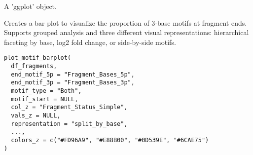 \documentclass[a4paper]{book}
\begin{document}
%
\begin{Value}
A 'ggplot' object.
\end{Value}
%
\begin{Description}
Creates a bar plot to visualize the proportion of 3-base motifs at fragment ends. Supports grouped analysis and
three different visual representations: hierarchical faceting by base, log2 fold change, or side-by-side motifs.
\end{Description}
%
\begin{Usage}
\begin{verbatim}
plot_motif_barplot(
  df_fragments,
  end_motif_5p = "Fragment_Bases_5p",
  end_motif_3p = "Fragment_Bases_3p",
  motif_type = "Both",
  motif_start = NULL,
  col_z = "Fragment_Status_Simple",
  vals_z = NULL,
  representation = "split_by_base",
  ...,
  colors_z = c("#FD96A9", "#E88B00", "#0D539E", "#6CAE75")
)
\end{verbatim}
\end{Usage}
%
\end{document}
